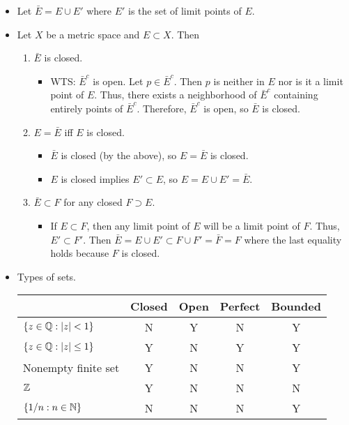 \documentclass[../../notes.tex]{subfiles}
\begin{document}
\begin{itemize}
\begin{itemize}
    \end{itemize}
    \item Let $\bar{E}=E\cup E'$ where $E'$ is the set of limit points of $E$.
    \item Let $X$ be a metric space and $E\subset X$. Then
    \begin{enumerate}
        \item $\bar{E}$ is closed.
        \begin{itemize}
            \item WTS: $\bar{E}^c$ is open. Let $p\in\bar{E}^c$. Then $p$ is neither in $E$ nor is it a limit point of $E$. Thus, there exists a neighborhood of $\bar{E}^c$ containing entirely points of $\bar{E}^c$. Therefore, $\bar{E}^c$ is open, so $\bar{E}$ is closed.
        \end{itemize}
        \item $E=\bar{E}$ iff $E$ is closed.
        \begin{itemize}
            \item $\bar{E}$ is closed (by the above), so $E=\bar{E}$ is closed.
            \item $E$ is closed implies $E'\subset E$, so $E=E\cup E'=\bar{E}$.
        \end{itemize}
        \item $\bar{E}\subset F$ for any closed $F\supset E$.
        \begin{itemize}
            \item If $E\subset F$, then any limit point of $E$ will be a limit point of $F$. Thus, $E'\subset F'$. Then $\bar{E}=E\cup E'\subset F\cup F'=\bar{F}=F$ where the last equality holds because $F$ is closed.
        \end{itemize}
    \end{enumerate}
    \item Types of sets.
    \begin{table}[h!]
        \centering
        \small
        \renewcommand{\arraystretch}{1.4}
        \begin{tabular}{l|c|c|c|c}
             & Closed & Open & Perfect & Bounded\\ \hline
            $\{z\in\mathbb{Q}:|z|<1\}$ & N & Y & N & Y\\ \hline
            $\{z\in\mathbb{Q}:|z|\leq 1\}$ & Y & N & Y & Y\\ \hline
            Nonempty finite set & Y & N & N & Y\\ \hline
            $\mathbb{Z}$ & Y & N & N & N\\ \hline
            $\{1/n:n\in\mathbb{N}\}$ & N & N & N & Y\\ \hline

\end{tabular}
\end{table}
\end{itemize}
\end{document}
